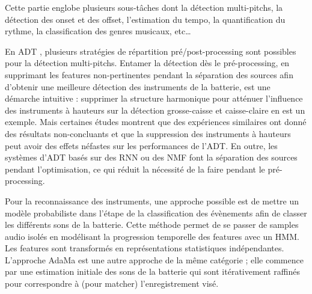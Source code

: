 Cette partie englobe plusieurs sous-tâches dont la détection multi-pitchs, 
la détection des onset et des offset, 
l'estimation du tempo, la quantification du rythme, 
la classification des genres musicaux, etc…


En ADT \cite{Review_ADT}, plusieurs stratégies de répartition pré/post-processing sont possibles pour la détection multi-pitchs. Entamer la détection dès le pré-processing, en supprimant les features non-pertinentes pendant la séparation des sources afin d’obtenir une meilleure détection des instruments de la batterie, est une démarche intuitive : supprimer la structure harmonique pour atténuer l’influence des instruments à hauteurs 
sur la détection grosse-caisse et caisse-claire en est un exemple. 
Mais certaines études montrent que des expériences similaires ont donné des résultats non-concluants et que la suppression des instruments à hauteurs peut avoir des effets néfastes sur les performances de l’ADT. En outre, les systèmes d’ADT basés sur des RNN ou des NMF font la séparation des sources pendant l’optimisation, ce qui réduit la nécessité de la faire pendant le pré-processing.

Pour la reconnaissance des instruments, une approche possible \cite{Eronen} 
est de mettre un modèle probabiliste dans l’étape de la classification des évènements 
afin de classer les différents sons de la batterie. 
Cette méthode permet de se passer de samples audio isolés en modélisant la progression temporelle 
des features avec un HMM. 
Les features sont transformés en représentations statistiques indépendantes.
L’approche AdaMa \cite{adama_1} est une autre approche de la même catégorie ; 
elle commence par une estimation initiale des sons de la batterie qui sont itérativement raffinés 
pour correspondre à (pour matcher) l’enregistrement visé.


